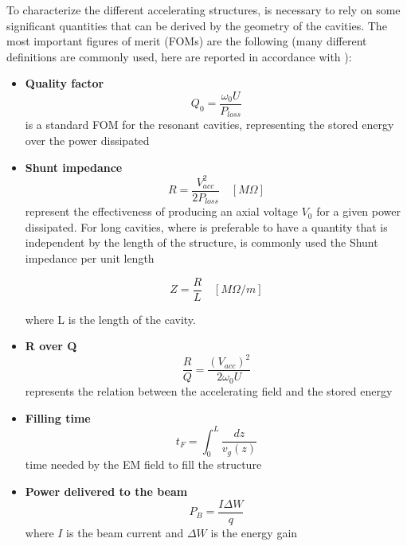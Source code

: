 To characterize the different accelerating structures, is necessary to rely on some significant quantities that can be derived by the geometry of the cavities. The most important figures of merit (FOMs) are the following (many different definitions are commonly used, here are reported in accordance with \cite{TECKER:RFCAS}):
\begin{itemize}

\item \textbf{Quality factor} 
\begin{equation}
Q_0 = \frac{\omega_0 U}{P_{loss}} 
\end{equation}
is a standard FOM for the resonant cavities, representing the stored energy over the power dissipated

\item \textbf{Shunt impedance} 
\begin{equation}
R = \frac{V_{acc}^2}{2P_{loss}}  \quad [M\Omega]
\end{equation}
represent the effectiveness of producing an axial voltage $V_0$ for a given power dissipated. For long cavities, where is preferable to have a quantity that is independent by the length of the structure, is commonly used the Shunt impedance per unit length

\begin{equation}
Z = \frac{R}{L}  \quad [M\Omega / m]
\end{equation}

where L is the length of the cavity.

\item \textbf{R over Q} 
\begin{equation}
\frac{R}{Q} = \frac{(V_{acc})^2}{2\omega_0 U} 
\end{equation}
represents the relation between the accelerating field and the stored energy


\item \textbf{Filling time}
\begin{equation}
t_F = \int_0^L \frac{dz}{v_g (z)}
\end{equation}
time needed by the EM field to fill the structure

\item \textbf{Power delivered to the beam}
\begin{equation}
P_B = \frac{I \Delta W}{q}
\end{equation}
where $I$ is the beam current and $\Delta W$ is the energy gain

\end{itemize}


